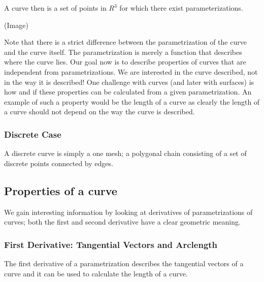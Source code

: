 A curve then is a set of points in $R^3$ for which there exist parameterizations. 

	(Image)
	
	Note that there is a strict difference between the parametrization of the curve and the curve itself. The parametrization is merely a function that describes where the curve lies. Our goal now is to describe properties of curves that are independent from parametrizations. We are interested in the curve described, not in the way it is described! One challenge with curves (and later with surfaces) is how and if these properties can be calculated from a given parametrization. An example of such a property would be the length of a curve as clearly the length of a curve should not depend on the way the curve is described.
	
	\subsubsection*{Discrete Case}
	
	A discrete curve is simply a one mesh; a polygonal chain consisting of a set of discrete points connected by edges.	
	
	
	\subsection{Properties of a curve}
	
	We gain interesting information by looking at derivatives of parametrizations of curves; both the first and second derivative have a clear geometric meaning.
	
	\subsubsection*{First Derivative: Tangential Vectors and Arclength}
	
	The first derivative of a parametrization describes the tangential vectors of a curve and it can be used to calculate the length of a curve.
	
